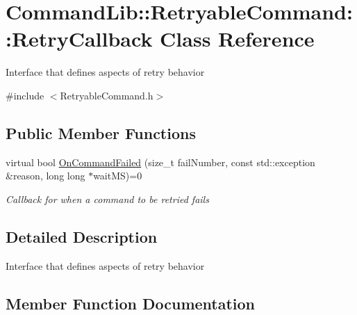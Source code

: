 \hypertarget{class_command_lib_1_1_retryable_command_1_1_retry_callback}{}\section{Command\+Lib\+:\+:Retryable\+Command\+:\+:Retry\+Callback Class Reference}
\label{class_command_lib_1_1_retryable_command_1_1_retry_callback}


Interface that defines aspects of retry behavior  




{\ttfamily \#include $<$Retryable\+Command.\+h$>$}

\subsection*{Public Member Functions}
\begin{DoxyCompactItemize}
\item 
virtual bool \mbox{\hyperlink{class_command_lib_1_1_retryable_command_1_1_retry_callback_ad207fa406f939f7253a3ee5777d5e26f}{On\+Command\+Failed}} (size\+\_\+t fail\+Number, const std\+::exception \&reason, long long $\ast$wait\+MS)=0
\begin{DoxyCompactList}\small\item\em Callback for when a command to be retried fails \end{DoxyCompactList}\end{DoxyCompactItemize}


\subsection{Detailed Description}
Interface that defines aspects of retry behavior 



\subsection{Member Function Documentation}
\mbox{\label{class_command_lib_1_1_retryable_command_1_1_retry_callback_ad207fa406f939f7253a3ee5777d5e26f}} 
